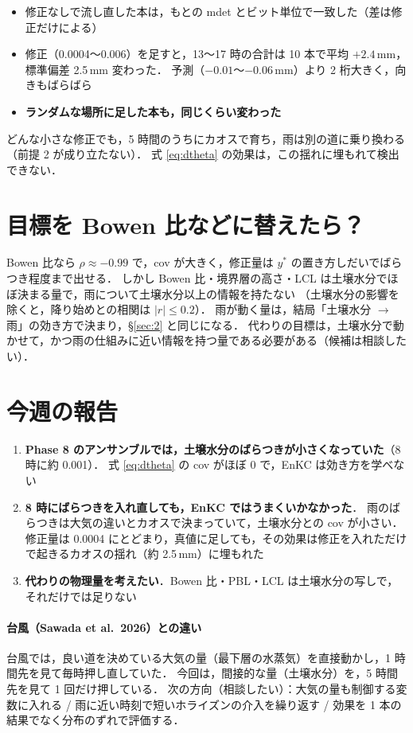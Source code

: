 \documentclass[dvipdfmx,a4paper,10.5pt]{jarticle}
\numberwithin{equation}{section}
\begin{document}
\begin{itemize}
  \item 修正なしで流し直した本は，もとの mdet とビット単位で一致した（差は修正だけによる）
  \item 修正（0.0004〜0.006）を足すと，13〜17 時の合計は 10 本で平均 $+2.4$\,mm，標準偏差 2.5\,mm 変わった．
        予測（$-0.01$〜$-0.06$\,mm）より 2 桁大きく，向きもばらばら
  \item \textbf{ランダムな場所に足した本も，同じくらい変わった}
\end{itemize}
どんな小さな修正でも，5 時間のうちにカオスで育ち，雨は別の道に乗り換わる（前提 2 が成り立たない）．
式 \eqref{eq:dtheta} の効果は，この揺れに埋もれて検出できない．

\section{目標を Bowen 比などに替えたら？}

Bowen 比なら $\rho\approx-0.99$ で，cov が大きく，修正量は $y^*$ の置き方しだいでばらつき程度まで出せる．
しかし Bowen 比・境界層の高さ・LCL は土壌水分でほぼ決まる量で，雨について土壌水分以上の情報を持たない
（土壌水分の影響を除くと，降り始めとの相関は $|r|\le0.2$）．
雨が動く量は，結局「土壌水分 $\to$ 雨」の効き方で決まり，\S\ref{sec:2} と同じになる．
代わりの目標は，土壌水分で動かせて，かつ雨の仕組みに近い情報を持つ量である必要がある（候補は相談したい）．

\section{今週の報告}

\begin{point}[title=報告すること]
\begin{enumerate}
  \item \textbf{Phase 8 のアンサンブルでは，土壌水分のばらつきが小さくなっていた}（8 時に約 0.001）．
        式 \eqref{eq:dtheta} の cov がほぼ 0 で，EnKC は効き方を学べない
  \item \textbf{8 時にばらつきを入れ直しても，EnKC ではうまくいかなかった}．
        雨のばらつきは大気の違いとカオスで決まっていて，土壌水分との cov が小さい．
        修正量は 0.0004 にとどまり，真値に足しても，その効果は修正を入れただけで起きるカオスの揺れ（約 2.5\,mm）に埋もれた
  \item \textbf{代わりの物理量を考えたい}．Bowen 比・PBL・LCL は土壌水分の写しで，それだけでは足りない
\end{enumerate}
\end{point}

\paragraph{台風（Sawada et al.\ 2026）との違い}
台風では，良い道を決めている大気の量（最下層の水蒸気）を直接動かし，1 時間先を見て毎時押し直していた．
今回は，間接的な量（土壌水分）を，5 時間先を見て 1 回だけ押している．
次の方向（相談したい）：大気の量も制御する変数に入れる / 雨に近い時刻で短いホライズンの介入を繰り返す /
効果を 1 本の結果でなく分布のずれで評価する．
\end{document}
